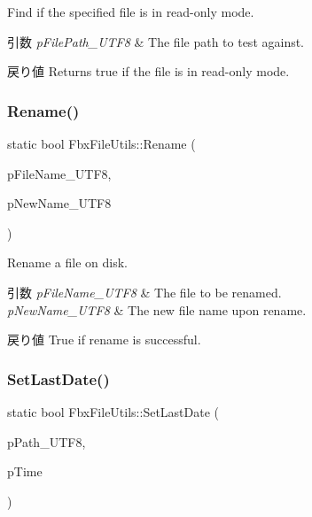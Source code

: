 Find if the specified file is in read-\/only mode. 
\begin{DoxyParams}{引数}
{\em p\+File\+Path\+\_\+\+U\+T\+F8} & The file path to test against. \\
\hline
\end{DoxyParams}
\begin{DoxyReturn}{戻り値}
Returns true if the file is in read-\/only mode. 
\end{DoxyReturn}
\mbox{\label{class_fbx_file_utils_a8fd66e9784dc281e1aabcf43e4f9949f}} 
\subsubsection{\texorpdfstring{Rename()}{Rename()}}
{\footnotesize\ttfamily static bool Fbx\+File\+Utils\+::\+Rename (\begin{DoxyParamCaption}\item[{const char $\ast$}]{p\+File\+Name\+\_\+\+U\+T\+F8,  }\item[{const char $\ast$}]{p\+New\+Name\+\_\+\+U\+T\+F8 }\end{DoxyParamCaption})\hspace{0.3cm}{\ttfamily [static]}}

Rename a file on disk. 
\begin{DoxyParams}{引数}
{\em p\+File\+Name\+\_\+\+U\+T\+F8} & The file to be renamed. \\
\hline
{\em p\+New\+Name\+\_\+\+U\+T\+F8} & The new file name upon rename. \\
\hline
\end{DoxyParams}
\begin{DoxyReturn}{戻り値}
True if rename is successful. 
\end{DoxyReturn}
\mbox{\label{class_fbx_file_utils_a5bdf966c2556bd9c4a86121452788053}} 
\subsubsection{\texorpdfstring{Set\+Last\+Date()}{SetLastDate()}}
{\footnotesize\ttfamily static bool Fbx\+File\+Utils\+::\+Set\+Last\+Date (\begin{DoxyParamCaption}\item[{const char $\ast$}]{p\+Path\+\_\+\+U\+T\+F8,  }\item[{\hyperlink{fbxtypes_8h_a70c7780f9a9ff5b9b08ab757b34e0726}{Fbx\+Long}}]{p\+Time }\end{DoxyParamCaption})\hspace{0.3cm}{\ttfamily [static]}}



